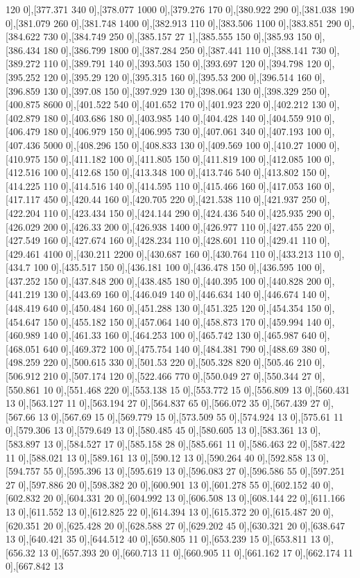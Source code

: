 {120 0],[377.371 340 0],[378.077 1000 0],[379.276 170 0],[380.922 290 0],[381.038 190 0],[381.079 260 0],[381.748 1400 0],[382.913 110 0],[383.506 1100 0],[383.851 290 0],[384.622 730 0],[384.749 250 0],[385.157 27 1],[385.555 150 0],[385.93 150 0],[386.434 180 0],[386.799 1800 0],[387.284 250 0],[387.441 110 0],[388.141 730 0],[389.272 110 0],[389.791 140 0],[393.503 150 0],[393.697 120 0],[394.798 120 0],[395.252 120 0],[395.29 120 0],[395.315 160 0],[395.53 200 0],[396.514 160 0],[396.859 130 0],[397.08 150 0],[397.929 130 0],[398.064 130 0],[398.329 250 0],[400.875 8600 0],[401.522 540 0],[401.652 170 0],[401.923 220 0],[402.212 130 0],[402.879 180 0],[403.686 180 0],[403.985 140 0],[404.428 140 0],[404.559 910 0],[406.479 180 0],[406.979 150 0],[406.995 730 0],[407.061 340 0],[407.193 100 0],[407.436 5000 0],[408.296 150 0],[408.833 130 0],[409.569 100 0],[410.27 1000 0],[410.975 150 0],[411.182 100 0],[411.805 150 0],[411.819 100 0],[412.085 100 0],[412.516 100 0],[412.68 150 0],[413.348 100 0],[413.746 540 0],[413.802 150 0],[414.225 110 0],[414.516 140 0],[414.595 110 0],[415.466 160 0],[417.053 160 0],[417.117 450 0],[420.44 160 0],[420.705 220 0],[421.538 110 0],[421.937 250 0],[422.204 110 0],[423.434 150 0],[424.144 290 0],[424.436 540 0],[425.935 290 0],[426.029 200 0],[426.33 200 0],[426.938 1400 0],[426.977 110 0],[427.455 220 0],[427.549 160 0],[427.674 160 0],[428.234 110 0],[428.601 110 0],[429.41 110 0],[429.461 4100 0],[430.211 2200 0],[430.687 160 0],[430.764 110 0],[433.213 110 0],[434.7 100 0],[435.517 150 0],[436.181 100 0],[436.478 150 0],[436.595 100 0],[437.252 150 0],[437.848 200 0],[438.485 180 0],[440.395 100 0],[440.828 200 0],[441.219 130 0],[443.69 160 0],[446.049 140 0],[446.634 140 0],[446.674 140 0],[448.419 640 0],[450.484 160 0],[451.288 130 0],[451.325 120 0],[454.354 150 0],[454.647 150 0],[455.182 150 0],[457.064 140 0],[458.873 170 0],[459.994 140 0],[460.989 140 0],[461.33 160 0],[464.253 100 0],[465.742 130 0],[465.987 640 0],[468.051 640 0],[469.372 100 0],[475.754 140 0],[484.381 790 0],[488.69 380 0],[498.259 220 0],[500.615 330 0],[501.53 220 0],[505.328 820 0],[505.46 210 0],[506.912 210 0],[507.174 120 0],[522.466 770 0],[550.049 27 0],[550.344 27 0],[550.861 10 0],[551.468 220 0],[553.138 15 0],[553.772 15 0],[556.809 13 0],[560.431 13 0],[563.127 11 0],[563.194 27 0],[564.837 65 0],[566.072 35 0],[567.439 27 0],[567.66 13 0],[567.69 15 0],[569.779 15 0],[573.509 55 0],[574.924 13 0],[575.61 11 0],[579.306 13 0],[579.649 13 0],[580.485 45 0],[580.605 13 0],[583.361 13 0],[583.897 13 0],[584.527 17 0],[585.158 28 0],[585.661 11 0],[586.463 22 0],[587.422 11 0],[588.021 13 0],[589.161 13 0],[590.12 13 0],[590.264 40 0],[592.858 13 0],[594.757 55 0],[595.396 13 0],[595.619 13 0],[596.083 27 0],[596.586 55 0],[597.251 27 0],[597.886 20 0],[598.382 20 0],[600.901 13 0],[601.278 55 0],[602.152 40 0],[602.832 20 0],[604.331 20 0],[604.992 13 0],[606.508 13 0],[608.144 22 0],[611.166 13 0],[611.552 13 0],[612.825 22 0],[614.394 13 0],[615.372 20 0],[615.487 20 0],[620.351 20 0],[625.428 20 0],[628.588 27 0],[629.202 45 0],[630.321 20 0],[638.647 13 0],[640.421 35 0],[644.512 40 0],[650.805 11 0],[653.239 15 0],[653.811 13 0],[656.32 13 0],[657.393 20 0],[660.713 11 0],[660.905 11 0],[661.162 17 0],[662.174 11 0],[667.842 13 }
